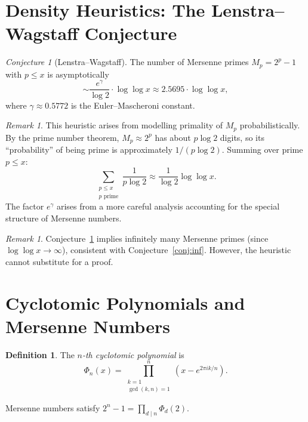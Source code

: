 \documentclass[12pt,a4paper]{amsart}
\theoremstyle{definition}
\newtheorem{definition}[theorem]{Definition}
\theoremstyle{remark}
\newtheorem{remark}[theorem]{Remark}
\newtheorem{conjecture}[theorem]{Conjecture}
\begin{document}
\section{Density Heuristics: The Lenstra--Wagstaff Conjecture}

\begin{conjecture}[Lenstra--Wagstaff]
\label{conj:LW}
The number of Mersenne primes $M_p = 2^p - 1$ with $p \leq x$ is
asymptotically
\[
  \sim \frac{e^\gamma}{\log 2} \cdot \log\log x
  \approx 2.5695 \cdot \log\log x,
\]
where $\gamma \approx 0.5772$ is the Euler--Mascheroni constant.
\end{conjecture}

\begin{remark}
This heuristic arises from modelling primality of $M_p$ probabilistically.
By the prime number theorem, $M_p \approx 2^p$ has about $p \log 2$ digits,
so its ``probability'' of being prime is approximately $1/(p \log 2)$.
Summing over prime $p \leq x$:
\[
  \sum_{\substack{p \leq x \\ p \text{ prime}}} \frac{1}{p \log 2}
  \approx \frac{1}{\log 2} \log\log x.
\]
The factor $e^\gamma$ arises from a more careful analysis accounting for
the special structure of Mersenne numbers.
\end{remark}

\begin{remark}
Conjecture~\ref{conj:LW} implies infinitely many Mersenne primes (since
$\log\log x \to \infty$), consistent with Conjecture~\ref{conj:inf}.
However, the heuristic cannot substitute for a proof.
\end{remark}

\section{Cyclotomic Polynomials and Mersenne Numbers}

\begin{definition}
The \emph{$n$-th cyclotomic polynomial} is
\[
  \Phi_n(x) = \prod_{\substack{k=1 \\ \gcd(k,n)=1}}^n (x - e^{2\pi i k/n}).
\]
\end{definition}

Mersenne numbers satisfy $2^n - 1 = \prod_{d \mid n} \Phi_d(2)$.
\end{document}
